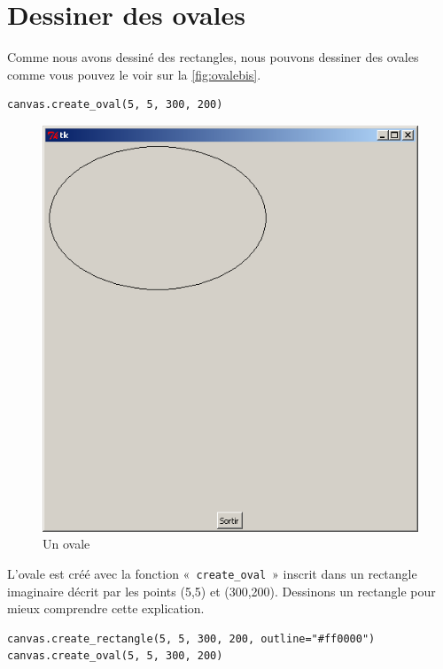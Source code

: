 \section{Dessiner des ovales}
Comme nous avons dessiné des rectangles, nous pouvons dessiner des ovales comme vous pouvez le voir sur la \autoref{fig:ovalebis}.

\begin{Verbatim}[frame=single,rulecolor=\color{mbleu}, label=à taper]
canvas.create_oval(5, 5, 300, 200)
\end{Verbatim}

\begin{figure}[h!]
\centering
\includegraphics[scale=0.4]{images/ovalebis}
\caption{Un ovale}\label{fig:ovalebis}
\end{figure}

L'ovale est créé avec la fonction « \texttt{create\_oval} » inscrit dans un rectangle imaginaire décrit par les points (5,5) et (300,200). Dessinons un rectangle pour mieux comprendre cette explication.

\begin{Verbatim}[frame=single,rulecolor=\color{mbleu}, label=à taper]
canvas.create_rectangle(5, 5, 300, 200, outline="#ff0000")
canvas.create_oval(5, 5, 300, 200)
\end{Verbatim}

